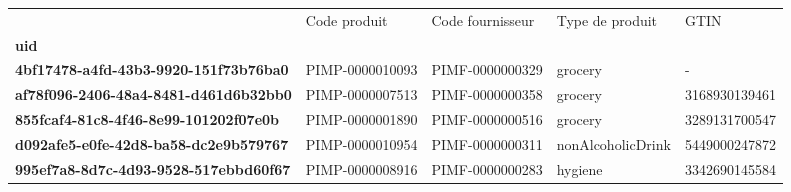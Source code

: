 \begin{tabularx}{\linewidth}{lXXXX}
\toprule
{} &     Code produit & Code fournisseur &    Type de produit &           GTIN \\
\textbf{uid                                 } &                  &                  &                    &                \\
\midrule
\textbf{4bf17478-a4fd-43b3-9920-151f73b76ba0} &  PIMP-0000010093 &  PIMF-0000000329 &            grocery &              - \\
\textbf{af78f096-2406-48a4-8481-d461d6b32bb0} &  PIMP-0000007513 &  PIMF-0000000358 &            grocery &  3168930139461 \\
\textbf{855fcaf4-81c8-4f46-8e99-101202f07e0b} &  PIMP-0000001890 &  PIMF-0000000516 &            grocery &  3289131700547 \\
\textbf{d092afe5-e0fe-42d8-ba58-dc2e9b579767} &  PIMP-0000010954 &  PIMF-0000000311 &  nonAlcoholicDrink &  5449000247872 \\
\textbf{995ef7a8-8d7c-4d93-9528-517ebbd60f67} &  PIMP-0000008916 &  PIMF-0000000283 &            hygiene &  3342690145584 \\
\bottomrule
\end{tabularx}
